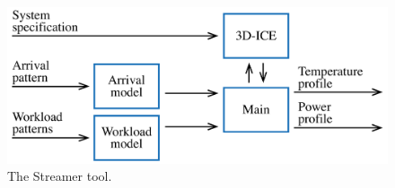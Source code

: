 \begin{figure}
  \centering
  \includegraphics[width=1.0\columnwidth]{include/assets/figures/streamer.pdf}
  \caption{The Streamer tool.}
\end{figure}
